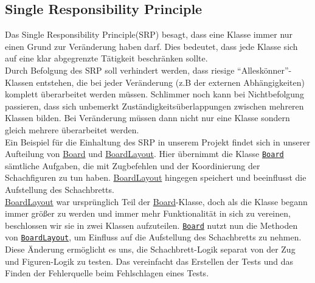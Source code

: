 \documentclass[
10pt, %
a4paper, %
oneside, %
headinclude,footinclude, %
BCOR5mm, %
]{scrartcl}
\begin{document}
\begin{onehalfspace}
\subsection{Single Responsibility Principle}
Das Single Responsibility Principle(SRP) besagt, dass eine Klasse immer nur einen Grund zur Veränderung haben darf. Dies bedeutet, dass jede Klasse sich auf eine klar abgegrenzte Tätigkeit beschränken sollte. 
\\
Durch Befolgung des SRP soll verhindert werden, dass riesige \enquote{Alleskönner}-Klassen entstehen, die bei jeder Veränderung (z.B der externen Abhängigkeiten) komplett überarbeitet werden müssen. Schlimmer noch kann bei Nichtbefolgung passieren, dass sich unbemerkt Zuständigkeitsüberlappungen zwischen mehreren Klassen bilden. Bei Veränderung müssen dann nicht nur eine Klasse sondern gleich mehrere überarbeitet werden.
\\
Ein Beispiel für die Einhaltung des SRP in unserem Projekt findet sich in unserer Aufteilung von \href{https://github.com/schmida736/Chess-AdvancedSE/blob/main/Chess-AdvancedSE/Game\%20Elements/Board.cs}{Board} und \href{https://github.com/schmida736/Chess-AdvancedSE/blob/main/Chess-AdvancedSE/Game\%20Elements/BoardLayout.cs}{BoardLayout}. Hier übernimmt die Klasse \texttt{\href{https://github.com/schmida736/Chess-AdvancedSE/blob/main/Chess-AdvancedSE/Game\%20Elements/Board.cs}{Board}} sämtliche Aufgaben, die mit Zugbefehlen und der Koordinierung der Schachfiguren zu tun haben. \href{https://github.com/schmida736/Chess-AdvancedSE/blob/main/Chess-AdvancedSE/Game\%20Elements/BoardLayout.cs}{BoardLayout} hingegen speichert und beeinflusst die Aufstellung des Schachbretts.
\\
\href{https://github.com/schmida736/Chess-AdvancedSE/blob/main/Chess-AdvancedSE/Game\%20Elements/BoardLayout.cs}{BoardLayout} war ursprünglich Teil der \href{https://github.com/schmida736/Chess-AdvancedSE/blob/main/Chess-AdvancedSE/Game\%20Elements/Board.cs}{Board}-Klasse, doch als die Klasse begann immer größer zu werden und immer mehr Funktionalität in sich zu vereinen, beschlossen wir sie in zwei Klassen aufzuteilen.
\texttt{\href{https://github.com/schmida736/Chess-AdvancedSE/blob/main/Chess-AdvancedSE/Game\%20Elements/Board.cs}{Board}} nutzt nun die Methoden von \texttt{\href{https://github.com/schmida736/Chess-AdvancedSE/blob/main/Chess-AdvancedSE/Game\%20Elements/BoardLayout.cs}{BoardLayout}}, um Einfluss auf die Aufstellung des Schachbretts zu nehmen.
\\
Diese Änderung ermöglicht es uns, die Schachbrett-Logik separat von der Zug und Figuren-Logik zu testen. Das vereinfacht das Erstellen der Tests und das Finden der Fehlerquelle beim Fehlschlagen eines Tests.

\end{onehalfspace}
\end{document}
